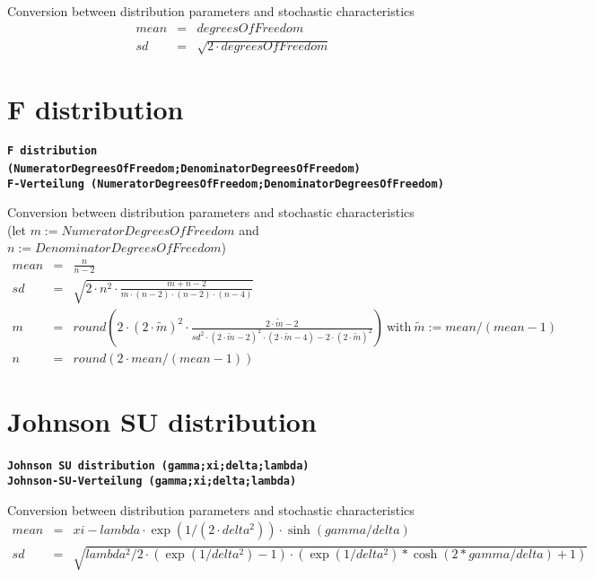 \documentclass{svmono}
\def\cm#1{\textbf{\texttt{#1}}}
\begin{document}
Conversion between distribution parameters and stochastic characteristics
\begin{eqnarray*}
mean&=&degreesOfFreedom\\
sd&=&\sqrt{2\cdot degreesOfFreedom}
\end{eqnarray*}





\section*{F distribution}
\cm{F distribution (NumeratorDegreesOfFreedom;DenominatorDegreesOfFreedom)}~\\
\cm{F-Verteilung (NumeratorDegreesOfFreedom;DenominatorDegreesOfFreedom)}

Conversion between distribution parameters and stochastic characteristics\\
(let $m:=NumeratorDegreesOfFreedom$ and $n:=DenominatorDegreesOfFreedom$)
\begin{eqnarray*}
mean&=&
\frac{n}{n-2}\\
sd&=&
\sqrt{2\cdot n^2\cdot\frac{m+n-2}{m\cdot(n-2)\cdot(n-2)\cdot(n-4)}}\\
m&=&
round\left(2\cdot (2\cdot\widetilde m)^2\cdot\frac{2\cdot\widetilde m-2}{sd^2\cdot (2\cdot\widetilde m-2)^2\cdot (2\cdot\widetilde m-4)-2\cdot (2\cdot\widetilde m)^2}\right) ~\text{with}~ \widetilde m:=mean/(mean-1)\\
n&=&
round(2\cdot mean/(mean-1))
\end{eqnarray*}





\section*{Johnson SU distribution}
\cm{Johnson SU distribution (gamma;xi;delta;lambda)}~\\
\cm{Johnson-SU-Verteilung (gamma;xi;delta;lambda)}

Conversion between distribution parameters and stochastic characteristics
\begin{eqnarray*}
mean&=&xi-lambda\cdot\exp(1/(2\cdot delta^2))\cdot\sinh(gamma/delta)\\
sd&=&\sqrt{lambda^2/2\cdot(\exp(1/delta^2)-1)\cdot(\exp(1/delta^2)*\cosh(2*gamma/delta)+1)}
\end{eqnarray*}
\end{document}
